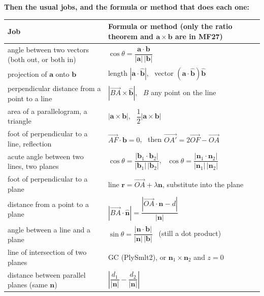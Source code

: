 \newpage
\textbf{Then the usual jobs, and the formula or method that does each one:}
\begin{center}
\renewcommand{\arraystretch}{1.28}
\small
\begin{tabular}{|p{5.6cm}|p{8.6cm}|}
\hline
\textbf{Job} & \textbf{Formula or method (only the ratio theorem and $\mathbf{a}\times\mathbf{b}$ are in MF27)} \\ \hline
angle between two vectors (both out, or both in) & $\cos\theta = \dfrac{\mathbf{a}\cdot\mathbf{b}}{|\mathbf{a}|\,|\mathbf{b}|}$ \\ \hline
projection of $\mathbf{a}$ onto $\mathbf{b}$ & length $|\mathbf{a}\cdot\hat{\mathbf{b}}|$, \ vector $(\mathbf{a}\cdot\hat{\mathbf{b}})\hat{\mathbf{b}}$ \\ \hline
perpendicular distance from a point to a line & $|\overrightarrow{BA}\times\hat{\mathbf{b}}|$, \ $B$ any point on the line \\ \hline
area of a parallelogram, a triangle & $|\mathbf{a}\times\mathbf{b}|$, \ $\dfrac{1}{2}|\mathbf{a}\times\mathbf{b}|$ \\ \hline
foot of perpendicular to a line, reflection & $\overrightarrow{AF}\cdot\mathbf{b} = 0$, \ then $\overrightarrow{OA'} = 2\overrightarrow{OF} - \overrightarrow{OA}$ \\ \hline
acute angle between two lines, two planes & $\cos\theta = \dfrac{|\mathbf{b}_1\cdot\mathbf{b}_2|}{|\mathbf{b}_1|\,|\mathbf{b}_2|}$, \ $\cos\theta = \dfrac{|\mathbf{n}_1\cdot\mathbf{n}_2|}{|\mathbf{n}_1|\,|\mathbf{n}_2|}$ \\ \hline
foot of perpendicular to a plane & line $\mathbf{r} = \overrightarrow{OA} + \lambda\mathbf{n}$, substitute into the plane \\ \hline
distance from a point to a plane & $|\overrightarrow{BA}\cdot\hat{\mathbf{n}}| = \dfrac{|\overrightarrow{OA}\cdot\mathbf{n} - d|}{|\mathbf{n}|}$ \\ \hline
angle between a line and a plane & $\sin\theta = \dfrac{|\mathbf{n}\cdot\mathbf{b}|}{|\mathbf{n}|\,|\mathbf{b}|}$ \ (still a dot product) \\ \hline
line of intersection of two planes & GC (PlySmlt2), or $\mathbf{n}_1\times\mathbf{n}_2$ and $z = 0$ \\ \hline
distance between parallel planes (same $\mathbf{n}$) & $\left|\dfrac{d_1}{|\mathbf{n}|} - \dfrac{d_2}{|\mathbf{n}|}\right|$ \\ \hline
\end{tabular}
\end{center}

